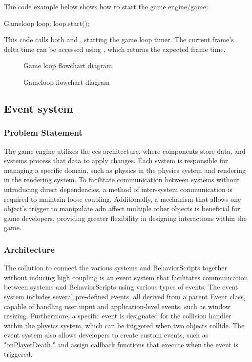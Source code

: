 \documentclass{projdoc}
\begin{document}
The code example below shows how to start the game engine/game:\noparbreak
\begin{blockcode}
Gameloop loop;
loop.start();
\end{blockcode}

This code calls both  and , starting the game
loop timer. The current frame’s delta time can be accessed using
, which returns the expected
frame time.

\begin{figure}
	\centering
	\caption{Game loop flowchart diagram}
	\label{fig:gameloop-flow}
\end{figure}

\begin{figure}
	\centering
	\caption{Gameloop flowchart diagram}
	\label{fig:gameloop-class}
\end{figure}

\subsection{Event system}

\subsubsection{Problem Statement}

The game engine utilizes the \gls{ecs} architecture, where components store data, and
systems process that data to apply changes. Each system is responsible for managing a
specific domain, such as physics in the physics system and rendering in the rendering
system. To facilitate communication between systems without introducing direct
dependencies, a method of inter-system communication is required to maintain loose
coupling. Additionally, a mechanism that allows one object's trigger to manipulate
adn affect multiple other objects is beneficial for game developers, providing
greater flexibility in designing interactions within the game.

\subsubsection{Architecture}

The sollution to connect the various systems and BehaviorScripts together without
inducing high coupling is an event system that facilitates communication between
systems and BehaviorScripts using various types of events. The event system includes
several pre-defined events, all derived from a parent Event class, capable of
handling user input and application-level events, such as window resizing.
Furthermore, a specific event is designated for the collision handler within the
physics system, which can be triggered when two objects collide. The event system
also allows developers to create custom events, such as "onPlayerDeath," and assign
callback functions that execute when the event is triggered.
\end{document}
